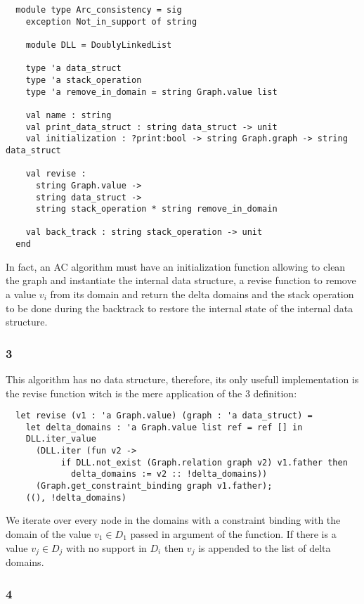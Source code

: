 \documentclass{rapport}
\begin{document}
\begin{verbatim}
  module type Arc_consistency = sig
    exception Not_in_support of string

    module DLL = DoublyLinkedList

    type 'a data_struct
    type 'a stack_operation
    type 'a remove_in_domain = string Graph.value list

    val name : string
    val print_data_struct : string data_struct -> unit
    val initialization : ?print:bool -> string Graph.graph -> string data_struct

    val revise :
      string Graph.value ->
      string data_struct ->
      string stack_operation * string remove_in_domain

    val back_track : string stack_operation -> unit
  end
\end{verbatim}

In fact, an AC algorithm must have an initialization function allowing to clean the graph and instantiate the internal data structure, a revise function to remove a value $v_i$ from its domain and return the delta domains and the stack operation to be done during the backtrack to restore the internal state of the internal data structure.

\subsubsection{\ac{3}}

This algorithm has no data structure, therefore, its only usefull implementation is the revise function witch is the mere application of the \ac{3} definition:

\begin{verbatim}
  let revise (v1 : 'a Graph.value) (graph : 'a data_struct) =
    let delta_domains : 'a Graph.value list ref = ref [] in
    DLL.iter_value
      (DLL.iter (fun v2 ->
           if DLL.not_exist (Graph.relation graph v2) v1.father then
             delta_domains := v2 :: !delta_domains))
      (Graph.get_constraint_binding graph v1.father);
    ((), !delta_domains)
\end{verbatim}

We iterate over every node in the domains with a constraint binding with the domain of the value $v_1 \in D_1$ passed in argument of the function. If there is a value $v_j \in D_j$ with no support in $D_i$ then $v_j$ is appended to the list of delta domains.

\subsubsection{\ac{4}}
\end{document}
